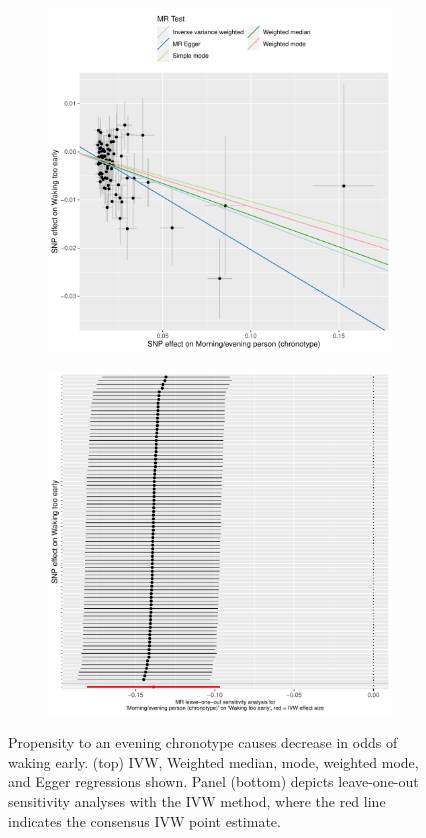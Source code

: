 \documentclass{article}
\begin{document}
\begin{figure}[htbp]
\begin{subfigure}{\linewidth}
\centering
	\includegraphics[width=.8\linewidth]{Figs/Analysis2/Morning_evening_person_(chronotype)_vs_Waking_too_early.Scatterplots.pdf}
\label{wakeScatter}
\end{subfigure}
\begin{subfigure}{\linewidth}
\centering
	\includegraphics[width=.8\linewidth,keepaspectratio]{Figs/Analysis2/Morning_evening_person_(chronotype)_vs_Waking_too_early.LOOplots.pdf}
\label{wakeLoo}
\end{subfigure}
\caption{Propensity to an evening chronotype causes decrease in odds of waking early. (top) IVW, Weighted median, mode, weighted mode, and Egger regressions shown. Panel (bottom) depicts leave-one-out sensitivity analyses with the IVW method, where the red line indicates the consensus IVW point estimate.}
\label{wake}
\end{figure}
\end{document}
